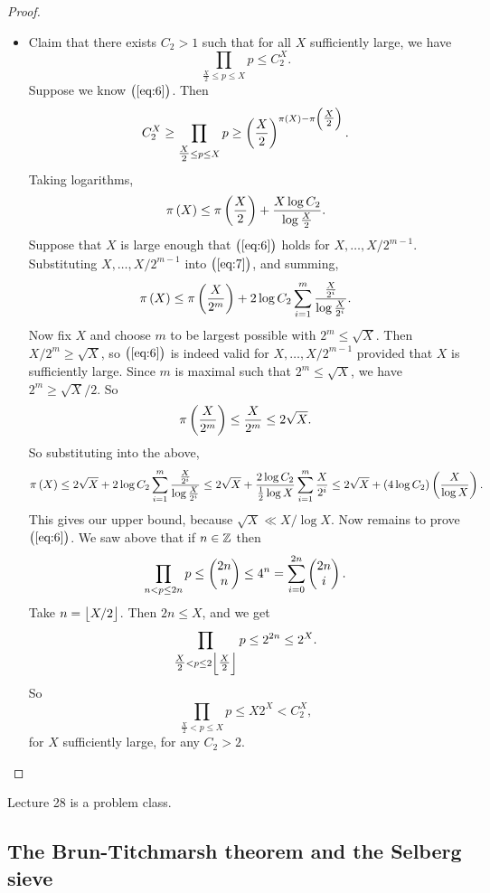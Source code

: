 \begin{proof}
\begin{itemize}
\pagebreak

\item Claim that there exists $ C_2 > 1 $ such that for all $ X $ sufficiently large, we have
\begin{equation}
\label{eq:6}
\prod_{\tfrac{X}{2} \le p \le X} p \le C_2^X.
\end{equation}
Suppose we know $ \br{\ref{eq:6}} $. Then
$$ C_2^X \ge \prod_{\tfrac{X}{2} \le p \le X} p \ge \br{\dfrac{X}{2}}^{\pi\br{X} - \pi\br{\tfrac{X}{2}}}. $$
Taking logarithms,
\begin{equation}
\label{eq:7}
\pi\br{X} \le \pi\br{\dfrac{X}{2}} + \dfrac{X\log C_2}{\log \tfrac{X}{2}}.
\end{equation}
Suppose that $ X $ is large enough that $ \br{\ref{eq:6}} $ holds for $ X, \dots, X / 2^{m - 1} $. Substituting $ X, \dots, X / 2^{m - 1} $ into $ \br{\ref{eq:7}} $, and summing,
$$ \pi\br{X} \le \pi\br{\dfrac{X}{2^m}} + 2\log C_2\sum_{i = 1}^m \dfrac{\tfrac{X}{2^i}}{\log \tfrac{X}{2^i}}. $$
Now fix $ X $ and choose $ m $ to be largest possible with $ 2^m \le \sqrt{X} $. Then $ X / 2^m \ge \sqrt{X} $, so $ \br{\ref{eq:6}} $ is indeed valid for $ X, \dots, X / 2^{m - 1} $ provided that $ X $ is sufficiently large. Since $ m $ is maximal such that $ 2^m \le \sqrt{X} $, we have $ 2^m \ge \sqrt{X} / 2 $. So
$$ \pi\br{\dfrac{X}{2^m}} \le \dfrac{X}{2^m} \le 2\sqrt{X}. $$
So substituting into the above,
$$ \pi\br{X} \le 2\sqrt{X} + 2\log C_2\sum_{i = 1}^m \dfrac{\tfrac{X}{2^i}}{\log \tfrac{X}{2^i}} \le 2\sqrt{X} + \dfrac{2\log C_2}{\tfrac{1}{2}\log X}\sum_{i = 1}^m \dfrac{X}{2^i} \le 2\sqrt{X} + \br{4\log C_2}\br{\dfrac{X}{\log X}}. $$
This gives our upper bound, because $ \sqrt{X} \ll X / \log X $. Now remains to prove $ \br{\ref{eq:6}} $. We saw above that if $ n \in \mathbb{Z} $ then
$$ \prod_{n < p \le 2n} p \le \begin{pmatrix} 2n \\ n \end{pmatrix} \le 4^n = \sum_{i = 0}^{2n} \begin{pmatrix} 2n \\ i \end{pmatrix}. $$
Take $ n = \left\lfloor X / 2 \right\rfloor $. Then $ 2n \le X $, and we get
$$ \prod_{\tfrac{X}{2} < p \le 2\left\lfloor \tfrac{X}{2} \right\rfloor} p \le 2^{2n} \le 2^X. $$
So
$$ \prod_{\tfrac{X}{2} < p \le X} p \le X2^X < C_2^X, $$
for $ X $ sufficiently large, for any $ C_2 > 2 $.
\end{itemize}
\end{proof}


Lecture 28 is a problem class.

\pagebreak

\subsection{The Brun-Titchmarsh theorem and the Selberg sieve}


